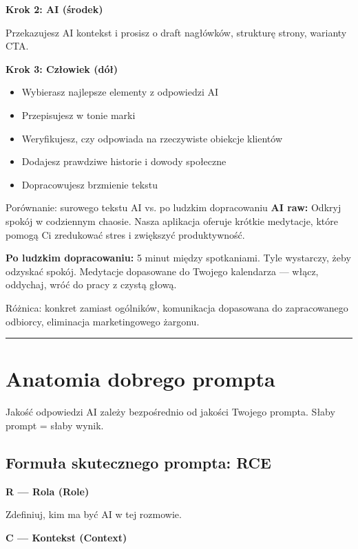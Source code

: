 \documentclass[
  12pt,
  a4paper,
  twoside,
  openright,
  12pt,
  DIV=12,
  BCOR=12mm]{scrbook}
\providecommand{\tightlist}{%
  \setlength{\itemsep}{0pt}\setlength{\parskip}{0pt}}\usepackage{longtable,booktabs,array}
\newcommand{\decoline}{%
  \begin{center}
    \textcolor{bordergray}{\rule{0.3\textwidth}{0.5pt}}
  \end{center}
}
\begin{document}
\textbf{Krok 2: AI (środek)}

Przekazujesz AI kontekst i prosisz o draft nagłówków, strukturę strony,
warianty CTA.

\textbf{Krok 3: Człowiek (dół)}

\begin{itemize}
\tightlist
\item
  Wybierasz najlepsze elementy z odpowiedzi AI
\item
  Przepisujesz w tonie marki
\item
  Weryfikujesz, czy odpowiada na rzeczywiste obiekcje klientów
\item
  Dodajesz prawdziwe historie i dowody społeczne
\item
  Dopracowujesz brzmienie tekstu
\end{itemize}

\begin{przyklad}{Porównanie: surowego tekstu AI vs. po ludzkim dopracowaniu}
\textbf{AI raw:}
Odkryj spokój w codziennym chaosie. Nasza aplikacja oferuje krótkie medytacje, które pomogą Ci zredukować stres i zwiększyć produktywność.

\textbf{Po ludzkim dopracowaniu:}
5 minut między spotkaniami. Tyle wystarczy, żeby odzyskać spokój. Medytacje dopasowane do Twojego kalendarza --- włącz, oddychaj, wróć do pracy z czystą głową.

Różnica: konkret zamiast ogólników, komunikacja dopasowana do zapracowanego odbiorcy, eliminacja marketingowego żargonu.
\end{przyklad}

\decoline

\section{Anatomia dobrego prompta}\label{anatomia-dobrego-prompta}

Jakość odpowiedzi AI zależy bezpośrednio od jakości Twojego prompta.
Słaby prompt = słaby wynik.

\subsection{Formuła skutecznego prompta:
RCE}\label{formuux142a-skutecznego-prompta-rce}

\textbf{R --- Rola (Role)}

Zdefiniuj, kim ma być AI w tej rozmowie.

\textbf{C --- Kontekst (Context)}
\end{document}
